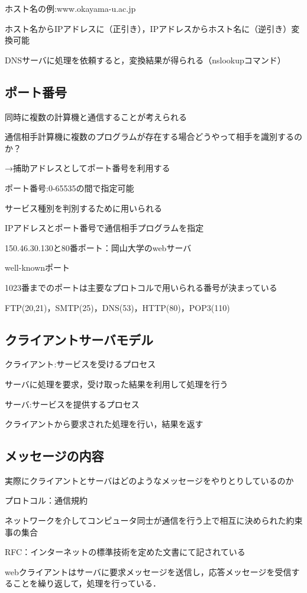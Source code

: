 \documentclass[a4j]{jarticle}
\begin{document}
ホスト名の例:www.okayama-u.ac.jp

ホスト名からIPアドレスに（正引き），IPアドレスからホスト名に（逆引き）変換可能

DNSサーバに処理を依頼すると，変換結果が得られる（nslookupコマンド）


\subsection{ポート番号}

同時に複数の計算機と通信することが考えられる

通信相手計算機に複数のプログラムが存在する場合どうやって相手を識別するのか？

→捕助アドレスとしてポート番号を利用する

ポート番号:0-65535の間で指定可能

サービス種別を判別するために用いられる

IPアドレスとポート番号で通信相手プログラムを指定

150.46.30.130と80番ポート：岡山大学のwebサーバ

well-knownポート

1023番までのポートは主要なプロトコルで用いられる番号が決まっている

FTP(20,21)，SMTP(25)，DNS(53)，HTTP(80)，POP3(110)


\subsection{クライアントサーバモデル}

クライアント:サービスを受けるプロセス

サーバに処理を要求，受け取った結果を利用して処理を行う

サーバ:サービスを提供するプロセス

クライアントから要求された処理を行い，結果を返す


\subsection{メッセージの内容}
実際にクライアントとサーバはどのようなメッセージをやりとりしているのか

プロトコル：通信規約

ネットワークを介してコンピュータ同士が通信を行う上で相互に決められた約束事の集合

RFC：インターネットの標準技術を定めた文書にて記されている


webクライアントはサーバに要求メッセージを送信し，応答メッセージを受信することを繰り返して，処理を行っている．
\end{document}
